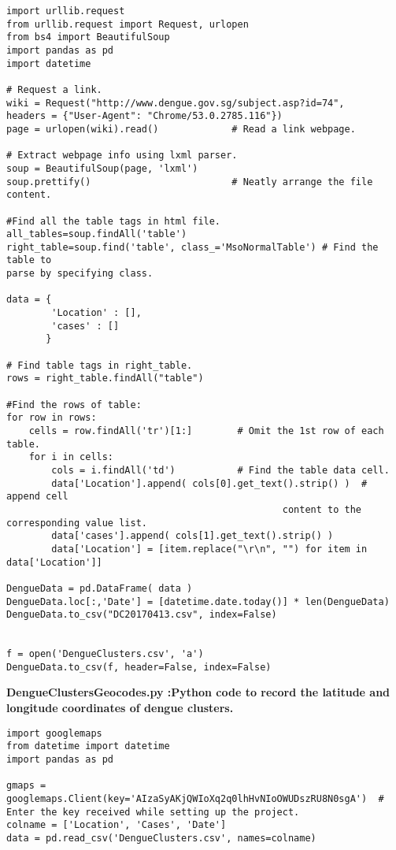 \documentclass[11pt]{exam}
\begin{document}
\begin{questions}
\begin{lstlisting}
import urllib.request
from urllib.request import Request, urlopen
from bs4 import BeautifulSoup
import pandas as pd
import datetime

# Request a link.
wiki = Request("http://www.dengue.gov.sg/subject.asp?id=74", 
headers = {"User-Agent": "Chrome/53.0.2785.116"})
page = urlopen(wiki).read()             # Read a link webpage.
 
# Extract webpage info using lxml parser.
soup = BeautifulSoup(page, 'lxml')
soup.prettify()                         # Neatly arrange the file content.

#Find all the table tags in html file.
all_tables=soup.findAll('table')
right_table=soup.find('table', class_='MsoNormalTable') # Find the table to 
parse by specifying class.

data = {
        'Location' : [],
        'cases' : []
       }

# Find table tags in right_table.
rows = right_table.findAll("table")

#Find the rows of table:
for row in rows:
    cells = row.findAll('tr')[1:]        # Omit the 1st row of each table.
    for i in cells:
        cols = i.findAll('td')           # Find the table data cell.
        data['Location'].append( cols[0].get_text().strip() )  # append cell
                                                 content to the corresponding value list.
        data['cases'].append( cols[1].get_text().strip() )
        data['Location'] = [item.replace("\r\n", "") for item in data['Location']]
        
DengueData = pd.DataFrame( data )
DengueData.loc[:,'Date'] = [datetime.date.today()] * len(DengueData)
DengueData.to_csv("DC20170413.csv", index=False)


f = open('DengueClusters.csv', 'a')
DengueData.to_csv(f, header=False, index=False)

\end{lstlisting}

\newpage
\color{black}
\textbf{DengueClustersGeocodes.py :Python code to record the latitude and longitude coordinates of dengue clusters.}
\color{Magenta}
\begin{lstlisting}
import googlemaps
from datetime import datetime
import pandas as pd

gmaps = googlemaps.Client(key='AIzaSyAKjQWIoXq2q0lhHvNIoOWUDszRU8N0sgA')  # Enter the key received while setting up the project.
colname = ['Location', 'Cases', 'Date']
data = pd.read_csv('DengueClusters.csv', names=colname)


\end{lstlisting}
\end{questions}
\end{document}
